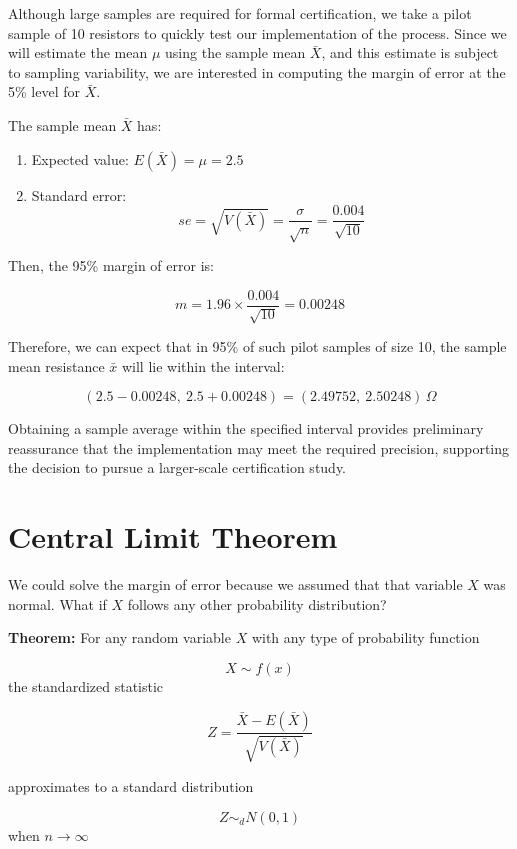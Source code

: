 \documentclass[
]{book}
\providecommand{\tightlist}{%
  \setlength{\itemsep}{0pt}\setlength{\parskip}{0pt}}
\begin{document}
Although large samples are required for formal certification, we take a pilot sample of 10 resistors to quickly test our implementation of the process. Since we will estimate the mean \(\mu\) using the sample mean \(\bar{X}\), and this estimate is subject to sampling variability, we are interested in computing the margin of error at the 5\% level for \(\bar{X}\).

The sample mean \(\bar{X}\) has:

\begin{enumerate}
\def\labelenumi{\arabic{enumi}.}
\tightlist
\item
  Expected value: \(E(\bar{X}) = \mu = 2.5\)
\item
  Standard error:
  \[
  se= \sqrt{V(\bar{X})} = \frac{\sigma}{\sqrt{n}} = \frac{0.004}{\sqrt{10}}
  \]
\end{enumerate}

Then, the 95\% margin of error is:

\[
m = 1.96 \times \frac{0.004}{\sqrt{10}} = 0.00248
\]

Therefore, we can expect that in 95\% of such pilot samples of size 10, the sample mean resistance \(\bar{x}\) will lie within the interval:

\[
(2.5 - 0.00248,\ 2.5 + 0.00248) = (2.49752,\ 2.50248)\,\Omega
\]

Obtaining a sample average within the specified interval provides preliminary reassurance that the implementation may meet the required precision, supporting the decision to pursue a larger-scale certification study.

\hypertarget{central-limit-theorem-1}{%
\section{Central Limit Theorem}\label{central-limit-theorem-1}}

We could solve the margin of error because we assumed that that variable \(X\) was normal. What if \(X\) follows any other probability distribution?

\textbf{Theorem:} For any random variable \(X\) with any type of probability function

\[X \sim f(x)\]
the standardized statistic

\[Z=\frac{\bar{X}-E(\bar{X})}{\sqrt{V(\bar{X})}}\]

approximates to a standard distribution

\[Z \sim_d N(0,1)\] when \(n\rightarrow \infty\)
\end{document}
